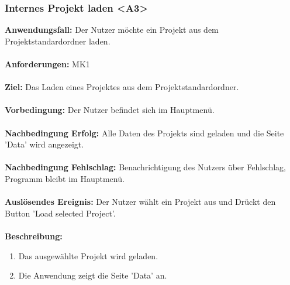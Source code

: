 \documentclass[parskip=full]{scrartcl} %
\begin{document}
\subsubsection*{Internes Projekt laden <A3>}
\textbf{Anwendungsfall:} Der Nutzer möchte ein Projekt aus dem Projektstandardordner laden.\\\\
\textbf{Anforderungen:} MK1 \\\\
\textbf{Ziel:} Das Laden eines Projektes aus dem Projektstandardordner. \\\\
\textbf{Vorbedingung:} Der Nutzer befindet sich im Hauptmenü.  \\\\
\textbf{Nachbedingung Erfolg:} Alle Daten des Projekts sind geladen und die Seite 'Data' wird angezeigt. \\\\
\textbf{Nachbedingung Fehlschlag:} Benachrichtigung des Nutzers über Fehlschlag, Programm  bleibt im Hauptmenü. \\\\
\textbf{Auslösendes Ereignis:}  Der Nutzer wählt ein Projekt aus und Drückt den Button 'Load selected Project'. \\\\
\textbf{Beschreibung:}
\begin{enumerate}
    \item Das ausgewählte Projekt wird geladen.
    \item Die Anwendung zeigt die Seite 'Data' an.
\end{enumerate}
\newpage
\end{document}
